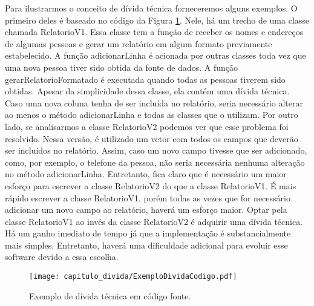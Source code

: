 Para ilustrarmos o conceito de dívida técnica forneceremos alguns exemplos. O primeiro deles é baseado no código da Figura \ref{fig:cap1_exemplo_divida_codigo}. Nele, há um trecho de uma classe chamada RelatorioV1. Essa classe tem a função de receber os nomes e endereços de algumas pessoas e gerar um relatório em algum formato previamente estabelecido. A função adicionarLinha é acionada por outras classes toda vez que uma nova pessoa tiver sido obtida da fonte de dados. A função gerarRelatorioFormatado é executada quando todas as pessoas tiverem sido obtidas. Apesar da simplicidade dessa classe, ela contém uma dívida técnica. Caso uma nova coluna tenha de ser incluída no relatório, seria necessário alterar ao menos o método adicionarLinha e todas as classes que o utilizam. Por outro lado, se analisarmos a classe RelatorioV2 podemos ver que esse problema foi resolvido. Nessa versão, é utilizado um vetor com todos os campos que deverão ser incluídos no relatório. Assim, caso um novo campo tivesse que ser adicionado, como, por exemplo, o telefone da pessoa, não seria necessária nenhuma alteração no método adicionarLinha. Entretanto, fica claro que é necessário um maior esforço para escrever a classe RelatorioV2 do que a classe RelatorioV1. É mais rápido escrever a classe RelatorioV1, porém todas as vezes que for necessário adicionar um novo campo ao relatório, haverá um esforço maior. Optar pela classe RelatorioV1 ao invés da classe RelatorioV2 é adquirir uma dívida técnica. Há um ganho imediato de tempo já que a implementação é substancialmente mais simples. Entretanto, haverá uma dificuldade adicional para evoluir esse software devido a essa escolha.

  \begin{figure}[H]
  \centering
  \texttt{[image: capitulo\_divida/ExemploDividaCodigo.pdf]} 
  \caption{Exemplo de dívida técnica em código fonte. }
  \label{fig:cap1_exemplo_divida_codigo} 
\end{figure}


